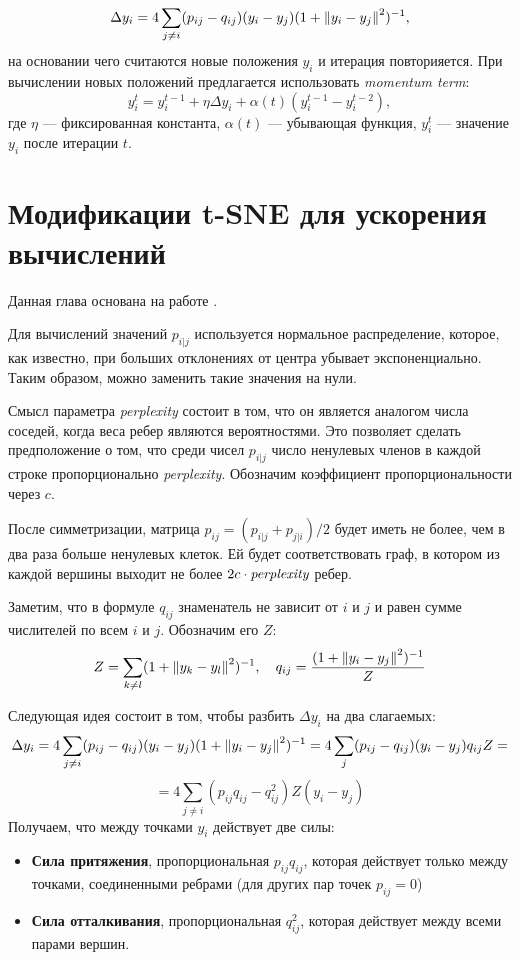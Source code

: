 $$\Delta y_i = 4 \sum_{j\neq i} (p_{ij} - q_{ij}) (y_i - y_j) (1 + \left\lVert y_i - y_j\right\rVert^2)^{-1},$$
на основании чего считаются новые положения $y_i$ и итерация повторияется. При вычислении новых положений предлагается использовать {\itshape momentum term}:
$$y_i^{t} = y_i^{t - 1} + \eta \Delta y_i + \alpha(t)(y_i^{t - 1} - y_i^{t - 2}),$$
где $\eta$ --- фиксированная константа, $\alpha(t)$ --- убывающая функция, $y_i^t$ --- значение $y_i$ после итерации $t$.

\section{Модификации t-SNE для ускорения вычислений}

Данная глава основана на работе \cite{acc_tsne}.

Для вычислений значений $p_{i|j}$ используется нормальное распределение, которое, как известно, при больших отклонениях от центра убывает экспоненциально. Таким образом, можно заменить такие значения на нули.

Смысл параметра {\itshape perplexity} состоит в том, что он является аналогом числа соседей, когда веса ребер являются вероятностями. Это позволяет сделать предположение о том, что среди чисел $p_{i|j}$ число ненулевых членов в каждой строке пропорционально {\itshape perplexity}. Обозначим коэффициент пропорциональности через $c$.

После симметризации, матрица $p_{ij} = (p_{i|j} + p_{j|i}) / 2$ будет иметь не более, чем в два раза больше ненулевых клеток. Ей будет соответствовать граф, в котором из каждой вершины выходит не более $2 c \cdot \mbox{\itshape perplexity}$ ребер.

Заметим, что в формуле $q_{ij}$ знаменатель не зависит от $i$ и $j$ и равен сумме числителей по всем $i$ и $j$. Обозначим его $Z$:
$$Z = \sum_{k\neq l} (1 + \left\lVert y_k - y_l\right\rVert^2)^{-1}, \quad q_{ij} =\frac{(1 + \left\lVert y_i - y_j\right\rVert^2)^{-1}}{Z} $$

Следующая идея состоит в том, чтобы разбить $\Delta y_i$ на два слагаемых:
$$\Delta y_i = 4 \sum_{j\neq i} (p_{ij} - q_{ij}) (y_i - y_j) (1 + \left\lVert y_i - y_j\right\rVert^2)^{-1} = 4 \sum_j (p_{ij} - q_{ij}) (y_i - y_j) q_{ij} Z = $$
$$ = 4\sum_{j\neq i}(p_{ij}q_{ij} - q_{ij}^2)Z(y_i - y_j)$$
Получаем, что между точками $y_{i}$ действует две силы:
\begin{itemize}
\item {\bfseries Сила притяжения}, пропорциональная $p_{ij}q_{ij}$, которая действует только между точками, соединенными ребрами (для других пар точек $p_{ij} = 0$)
\item {\bfseries Сила отталкивания}, пропорциональная $q_{ij}^2$, которая действует между всеми парами вершин.
\end{itemize}

